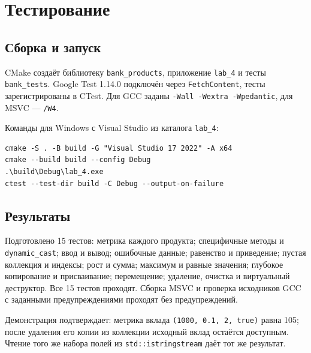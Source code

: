 \section{Тестирование}

\subsection{Сборка и запуск}
CMake создаёт библиотеку \texttt{bank\_products}, приложение \texttt{lab\_4} и тесты \texttt{bank\_tests}. Google Test 1.14.0 подключён через \texttt{FetchContent}, тесты зарегистрированы в CTest. Для GCC заданы \texttt{-Wall -Wextra -Wpedantic}, для MSVC --- \texttt{/W4}.



Команды для Windows с Visual Studio из каталога \texttt{lab\_4}:
\begin{verbatim}
cmake -S . -B build -G "Visual Studio 17 2022" -A x64
cmake --build build --config Debug
.\build\Debug\lab_4.exe
ctest --test-dir build -C Debug --output-on-failure
\end{verbatim}

\subsection{Результаты}
Подготовлено 15 тестов: метрика каждого продукта; специфичные методы и \texttt{dynamic\_cast}; ввод и вывод; ошибочные данные; равенство и приведение; пустая коллекция и индексы; рост и сумма; максимум и равные значения; глубокое копирование и присваивание; перемещение; удаление, очистка и виртуальный деструктор. Все 15 тестов проходят. Сборка MSVC и проверка исходников GCC с заданными предупреждениями проходят без предупреждений.

Демонстрация подтверждает: метрика вклада \texttt{(1000, 0.1, 2, true)} равна 105; после удаления его копии из коллекции исходный вклад остаётся доступным. Чтение того же набора полей из \texttt{std::istringstream} даёт тот же результат.
